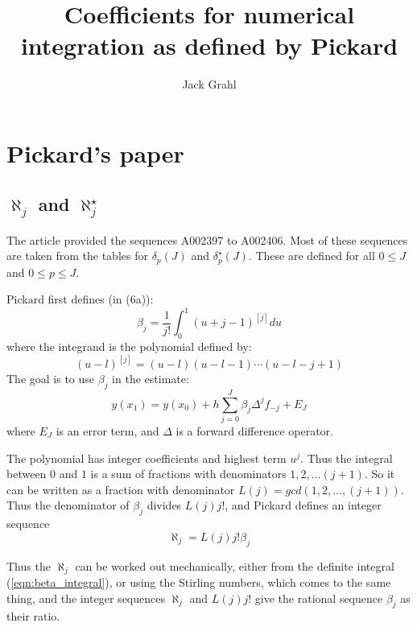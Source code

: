 \documentclass{article}
\title{Coefficients for numerical integration as defined by Pickard}
\author{Jack Grahl}
\begin{document}
\maketitle
{}

\section{Pickard's paper}
\subsection{$\aleph_j$ and $\aleph^{\star}_j$}
The article \cite{pickard} provided the sequences A002397 to A002406. Most of these sequences are taken from the tables for $\delta_p(J)$ and $\delta^{\star}_p(J)$. These are defined for all $0 \leq J$ and $0 \leq p \leq J$.

Pickard first defines (in (6a)):
\begin{equation}\label{eqn:beta_integral}
 \beta_j = \frac{1}{j!}\int_0^1 (u + j - 1)^{[j]} du 
\end{equation}
where the integrand is the polynomial defined by:
\[ (u - l)^{[j]} = (u - l)(u - l - 1)\cdots(u - l - j + 1) \]
The goal is to use $\beta_j$ in the estimate:
\[ y(x_1) = y(x_0) + h\sum_{j=0}^{J} \beta_j \Delta^{j}f_{-j} + E_{J} \]
where $E_J$ is an error term, and $\Delta$ is a forward difference operator.

The polynomial has integer coefficients and highest term $u^{j}$.
Thus the integral between $0$ and $1$ is a sum of fractions with denominators $1, 2, \ldots (j+1)$.
So it can be written as a fraction with denominator $L(j) = gcd(1, 2, \ldots, (j+1))$.
Thus the denominator of $\beta_j$ divides $L(j)j!$, and Pickard defines an integer sequence
\begin{equation}\label{eqn:aleph}
 \aleph_j = L(j)j!\beta_j 
\end{equation}

Thus the $\aleph_j$ can be worked out mechanically, either from the definite integral (\ref{eqn:beta_integral}), or using the Stirling numbers, which comes to the same thing, and the integer sequences $\aleph_j$ and $L(j)j!$ give the rational sequence $\beta_j$ as their ratio.
\end{document}
